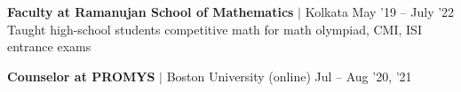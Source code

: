\resumeProjectHeading
{\textbf{Faculty at Ramanujan School of Mathematics} $|$ Kolkata}
{May '19 -- July '22}\\
\vspace{4pt}
{\color{gray}Taught high-school students competitive math for math olympiad, CMI, ISI entrance exams}
\vspace{-18pt}

\resumeProjectHeading
{\textbf{Counselor at PROMYS} $|$ Boston University (online)}
{Jul -- Aug '20, '21}

%

\resumeSubHeadingListEnd


















%
%
%
%
%
%
%
\vspace{-15pt}



